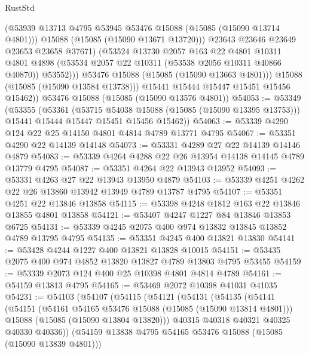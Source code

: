 \begin{lexlean}{RustStd}
\begin{coremodule}
                    (@53939 @13713 @4795 @53945 @53476 @15088 (@15085 (@15090 @13714 @4801)))
                    @15088
                    (@15085 (@15090 @13671 @13720)))
                  @23643
                  @23646
                  @23649
                  @23653
                  @23658
                  @37671)
                (@53524
                  @13730
                  @2057
                  @163
                  @22
                  @4801
                  @10311
                  @4801
                  @4898
                  (@53534 @2057 @22 @10311 (@53538 @2056 @10311 @40866 @40870))
                  @53552)))
            @53476
            @15088
            (@15085 (@15090 @13663 @4801)))
          @15088
          (@15085 (@15090 @13584 @13738)))
        @15441
        @15444
        @15447
        @15451
        @15456
        @15462))
    @53476
    @15088
    (@15085 (@15090 @13576 @4801))
@54053 := @53349
    (@53355
      (@53361
        (@53715 @54038 @15088 (@15085 (@15090 @13395 @13753)))
        @15441
        @15444
        @15447
        @15451
        @15456
        @15462))
@54063 := @53339 @4290 @124 @22 @25 @14150 @4801 @4814 @4789 @13771 @4795
@54067 := @53351 @4290 @22 @14139 @14148
@54073 := @53331 @4289 @27 @22 @14139 @14146 @4879
@54083 := @53339 @4264 @4288 @22 @26 @13954 @14138 @14145 @4789 @13779 @4795
@54087 := @53351 @4264 @22 @13943 @13952
@54093 := @53331 @4263 @27 @22 @13943 @13950 @4879
@54103 := @53339 @4251 @4262 @22 @26 @13860 @13942 @13949 @4789 @13787 @4795
@54107 := @53351 @4251 @22 @13846 @13858
@54115 := @53398 @4248 @1812 @163 @22 @13846 @13855 @4801 @13858
@54121 := @53407 @4247 @1227 @84 @13846 @13853 @6725
@54131 := @53339 @4245 @2075 @400 @974 @13832 @13845 @13852 @4789 @13795 @4795
@54135 := @53351 @4245 @400 @13821 @13830
@54141 := @53428 @4244 @1227 @400 @13821 @13828 @10015
@54151 := @53435 @2075 @400 @974 @4852 @13820 @13827 @4789 @13803 @4795 @53455
@54159 := @53339 @2073 @124 @400 @25 @10398 @4801 @4814 @4789
@54161 := @54159 @13813 @4795
@54165 := @53469 @2072 @10398 @41031 @41035
@54231 := @54103
    (@54107
      (@54115
        (@54121
          (@54131
            (@54135
              (@54141
                (@54151
                  (@54161 @54165 @53476 @15088 (@15085 (@15090 @13814 @4801)))
                  @15088
                  (@15085 (@15090 @13804 @13820)))
                @40315
                @40318
                @40321
                @40325
                @40330
                @40336))
            (@54159 @13838 @4795 @54165 @53476 @15088 (@15085 (@15090 @13839 @4801)))

\end{coremodule}
\end{lexlean}
